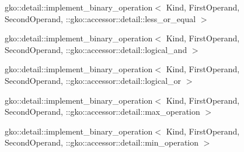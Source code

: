 \begin{DoxyCompactList}
\begin{DoxyCompactList}
\item {}
\end{DoxyCompactList}
\item gko\+:\+:detail\+:\+:implement\+\_\+binary\+\_\+operation$<$ Kind, First\+Operand, Second\+Operand, \+:\+:gko\+:\+:accessor\+:\+:detail\+:\+:less\+\_\+or\+\_\+equal $>$\begin{DoxyCompactList}
\item {}
\end{DoxyCompactList}
\item gko\+:\+:detail\+:\+:implement\+\_\+binary\+\_\+operation$<$ Kind, First\+Operand, Second\+Operand, \+:\+:gko\+:\+:accessor\+:\+:detail\+:\+:logical\+\_\+and $>$\begin{DoxyCompactList}
\item {}
\end{DoxyCompactList}
\item gko\+:\+:detail\+:\+:implement\+\_\+binary\+\_\+operation$<$ Kind, First\+Operand, Second\+Operand, \+:\+:gko\+:\+:accessor\+:\+:detail\+:\+:logical\+\_\+or $>$\begin{DoxyCompactList}
\item {}
\end{DoxyCompactList}
\item gko\+:\+:detail\+:\+:implement\+\_\+binary\+\_\+operation$<$ Kind, First\+Operand, Second\+Operand, \+:\+:gko\+:\+:accessor\+:\+:detail\+:\+:max\+\_\+operation $>$\begin{DoxyCompactList}
\item {}
\end{DoxyCompactList}
\item gko\+:\+:detail\+:\+:implement\+\_\+binary\+\_\+operation$<$ Kind, First\+Operand, Second\+Operand, \+:\+:gko\+:\+:accessor\+:\+:detail\+:\+:min\+\_\+operation $>$\begin{DoxyCompactList}

\end{DoxyCompactList}
\end{DoxyCompactList}
